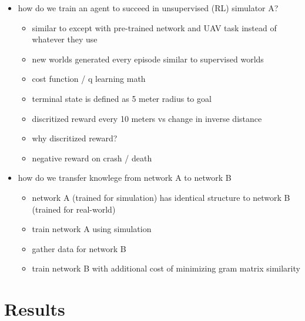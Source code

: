 \documentclass[paper=a4, fontsize=11pt]{scrartcl} %
\begin{document}
\begin{itemize}
	\item how do we train an agent to succeed in unsupervised (RL) simulator A?
	\begin{itemize}
		\item similar to \cite{Lillicrap2015} except with pre-trained network and UAV task instead of whatever they use
		\item new worlds generated every episode similar to supervised worlds
		\item cost function / q learning math
		\item terminal state is defined as 5 meter radius to goal
		\item discritized reward every 10 meters vs change in inverse distance
		\item why discritized reward?
		\item negative reward on crash / death
	\end{itemize}

	\item how do we transfer knowlege from network A to network B
	\begin{itemize}
		\item network A (trained for simulation) has identical structure to network B (trained for real-world)
		\item train network A using simulation
		\item gather data for network B
		\item train network B with additional cost of minimizing gram matrix similarity
	\end{itemize}

\end{itemize}


\section{Results}
\end{document}
